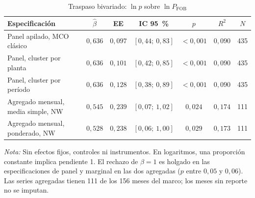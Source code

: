\documentclass[11pt]{article}
\newcommand{\note}[2]{%
  \par\vspace{0.5ex}
  \begin{minipage}{#1}\footnotesize\textit{Nota:} #2\end{minipage}%
}
\begin{document}
\begin{table}[htbp]
  \caption{Traspaso bivariado: $\ln p$ sobre $\ln P_{\text{FOB}}$}\label{tab:fob_biv}
  \centering
  \begin{tabular}{@{} lcccccc @{}}
    \toprule
    Especificación & $\hat\beta$ & EE & IC 95~\% & $p$ & $R^2$ & $N$ \\
    \midrule
    Panel apilado, MCO clásico & $0{,}636$ & $0{,}097$ & $[0{,}44;\ 0{,}83]$ & $<0{,}001$ & $0{,}090$ & 435 \\
    Panel, cluster por planta  & $0{,}636$ & $0{,}101$ & $[0{,}42;\ 0{,}85]$ & $<0{,}001$ & $0{,}090$ & 435 \\
    Panel, cluster por período & $0{,}636$ & $0{,}128$ & $[0{,}38;\ 0{,}89]$ & $<0{,}001$ & $0{,}090$ & 435 \\
    Agregado mensual, media simple, NW & $0{,}545$ & $0{,}239$ & $[0{,}07;\ 1{,}02]$ & $0{,}024$ & $0{,}174$ & 111 \\
    Agregado mensual, ponderado, NW    & $0{,}528$ & $0{,}238$ & $[0{,}06;\ 1{,}00]$ & $0{,}029$ & $0{,}173$ & 111 \\
    \bottomrule
  \end{tabular}
  \note{0.9\textwidth}{Sin efectos fijos, controles ni instrumentos. En logaritmos, una proporción constante implica pendiente 1. El rechazo de $\beta=1$ es holgado en las especificaciones de panel y marginal en las dos agregadas ($p$ entre $0{,}05$ y $0{,}06$). Las series agregadas tienen 111 de los 156 meses del marco; los meses sin reporte no se imputan.}
\end{table}
\end{document}
